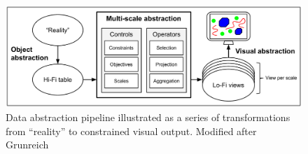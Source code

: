\documentclass[11pt, oneside]{report}
\newcommand{\marcos}[1]{\ \\ \fbox{\parbox{1.0\linewidth}{{\sc Marcos}:\\ #1}}}
\begin{document}
\begin{figure}[htbp]
\begin{center}
\includegraphics[scale=.5]{figs-thesis/abstraction-pipeline.pdf}
\caption{Data abstraction pipeline illustrated as a series of transformations from ``reality'' to constrained visual output. Modified after Grunreich~\cite{gruenreich1985cag}}
\label{fig:related:work:data:abstraction}
\end{center}
\end{figure}


\end{document}

